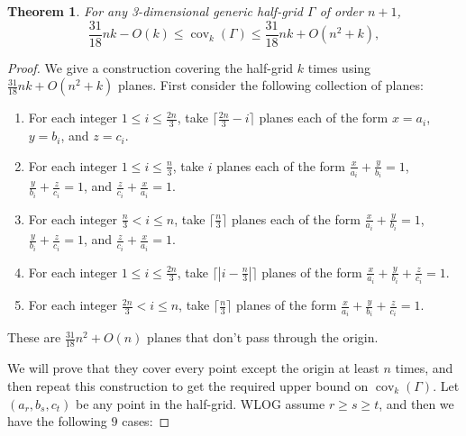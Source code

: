 \documentclass[usenames,dvipsnames, 11pt]{article}
\newtheorem{thm}{Theorem}
\numberwithin{thm}{section}
\theoremstyle{definition}
\theoremstyle{definition}
\theoremstyle{definition}
\newcommand{\cov}[1]{\operatorname{cov}_{#1}}
\newcommand{\1}{\mathbf{1}}
\begin{document}
\begin{thm}
    For any 3-dimensional generic half-grid $\Gamma$ of order $n+1$, 
    \[
\frac{31}{18}nk-O(k)
\leq
\cov{k}(\Gamma)
\leq
\frac{31}{18}nk+O(n^2+k),
\]
\end{thm}
\begin{proof}
    We give a construction covering the half-grid $k$ times using $\frac{31}{18}nk + O(n^2+k)$ planes. 
    First consider the following collection of planes:
    \begin{enumerate}
        \item\label{type 1} For each integer $1 \leq i \leq \frac{2n}{3}$, take $\lceil\frac{2n}{3}-i\rceil$ planes each of the form $x=a_i$, $y=b_i$, and $z=c_i$.
        \item\label{type 2} For each integer $1 \leq i \leq \frac{n}{3}$, take $i$ planes each of the form $\frac{x}{a_i}+\frac{y}{b_i}=1$, $\frac{y}{b_i}+\frac{z}{c_i}=1$, and $\frac{z}{c_i}+\frac{x}{a_i}=1$.
        \item\label{type 3} For each integer $\frac{n}{3} < i \leq n$, take $\lceil\frac{n}{3}\rceil$ planes each of the form $\frac{x}{a_i}+\frac{y}{b_i}=1$, $\frac{y}{b_i}+\frac{z}{c_i}=1$, and $\frac{z}{c_i}+\frac{x}{a_i}=1$.
        \item\label{type 4} For each integer $1 \leq i \leq \frac{2n}{3}$, take $\lceil|i-\frac{n}{3}|\rceil$ planes of the form $\frac{x}{a_i}+\frac{y}{b_i}+\frac{z}{c_i}=1$.
        \item\label{type 5} For each integer $ \frac{2n}{3} < i \leq n$, take $\lceil\frac{n}{3}\rceil$ planes of the form $\frac{x}{a_i}+\frac{y}{b_i}+\frac{z}{c_i}=1$.
    \end{enumerate}
    These are $\frac{31}{18}n^2+O(n)$ planes that don't pass through the origin. 

    We will prove that they cover every point except the origin at least $n$ times, and then repeat this construction to get the required upper bound on $\cov{k}({\Gamma})$.  
Let $(a_r, b_s, c_t)$ be any point in the half-grid.  
WLOG assume $r \geq s \geq t$, and then we have the following $9$ cases:  


\end{proof}
\end{document}

